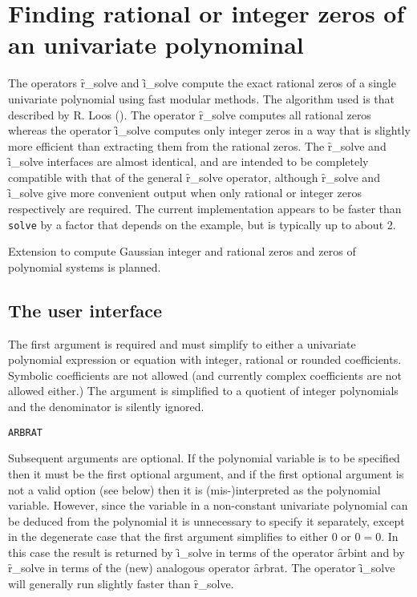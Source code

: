 \section{Finding rational or integer zeros of an univariate polynominal}

\iffalse
  The operators \f{r\_solve} and \f{i_\solve}  compute
  respectively the exact rational or integer zeros of a single
  univariate polynomial using fast modular methods.


  \subsection{Introduction}
  \fi
{}
\hypertarget{operator:I_SOLVE}{}
\hypertarget{operator:R_SOLVE}{}
The operators \f{r\_solve} and \f{i\_solve}  compute the exact rational zeros
of a single univariate polynomial using fast modular methods.  The
algorithm used is that described by R. Loos (\cite{Loos:1983a}).
The operator \f{r\_solve} computes
all rational zeros whereas the operator \f{i\_solve} computes only
integer zeros in a way that is slightly more efficient than extracting
them from the rational zeros.  The \f{r\_solve} and \f{i\_solve}
interfaces are almost identical, and are intended to be completely
compatible with that of the general \f{r\_solve} operator, although
\f{r\_solve} and \f{i\_solve} give more convenient output when
only rational or integer zeros respectively are required.  The current
implementation appears to be faster than \verb|solve| by a factor that
depends on the example, but is typically up to about 2.

Extension to compute Gaussian integer and rational
zeros and zeros of polynomial systems is planned.


\subsection{The user interface}

The first argument is required and must simplify to either a
univariate polynomial expression or equation with integer, rational or
rounded coefficients.  Symbolic coefficients are not allowed (and
currently complex coefficients are not allowed either.)  The argument
is simplified to a quotient of integer polynomials and the denominator
is silently ignored.

\hypertarget{operator:ARBRAT}{\texttt{ARBRAT}}
Subsequent arguments are optional.  If the polynomial variable is to
be specified then it must be the first optional argument, and if the
first optional argument is not a valid option (see below) then it is
(mis-)interpreted as the polynomial variable.  However, since the
variable in a non-constant univariate polynomial can be deduced from
the polynomial it is unnecessary to specify it separately, except in
the degenerate case that the first argument simplifies to either 0 or
$0 = 0$.  In this case the result is returned by \f{i\_solve} in
terms of the operator \f{arbint} and by \f{r\_solve} in terms of
the (new) analogous operator \f{arbrat}.  The operator
\f{i\_solve} will generally run slightly faster than \f{r\_solve}.
  
